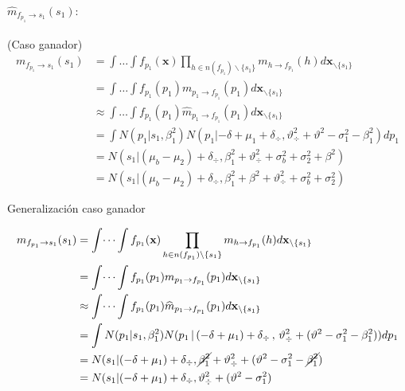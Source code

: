 \documentclass[11pt,twoside,spanish]{report} %
\begin{document}


\paragraph{$\widehat{m}_{f_{p_1} \rightarrow s_1}(s_1):$} (Caso ganador)
\begin{equation}
	\begin{split}
		m_{f_{p_1} \rightarrow s_1}(s_1) & = \int \dots \int f_{p_1}(\textbf{x}) \prod_{h \in n(f_{p_1}) \backslash \{s_1\} } m_{h \rightarrow f_{p_1}}(h)  d\textbf{x}_{\backslash \{s_1\} }  \\
		&= \int \dots \int f_{p_1}(p_1)m_{p_1 \rightarrow f_{p_1}}(p_1) d\textbf{x}_{\backslash \{s_1\} }  \\
		&\approx \int \dots \int f_{p_1}(p_1)\widehat{m}_{p_1 \rightarrow f_{p_1}}(p_1) d\textbf{x}_{\backslash \{s_1\} }  \\
		&= \int  N(p_1| s_1, \beta_1^2)  N( p_1 |  -\delta + \mu_1 + \delta_{\div} ,\vartheta_{\div}^2 + \vartheta^2 -\sigma_1^2 - \beta_1^2)   dp_1 \\
		&=  N( s_1|(\mu_b - \mu_2) + \delta_{\div} , \beta_1^2+\vartheta_{\div}^2 + \sigma_b^2 + \sigma_2^2 + \beta^2) \\
		&=  N( s_1|(\mu_b - \mu_2) + \delta_{\div} ,\beta_1^2+ \beta^2+\vartheta_{\div}^2 + \sigma_b^2 + \sigma_2^2)
	\end{split}
\end{equation}

Generalizaci\'on caso ganador

\begin{equation}
	\begin{split}
		m_{f_{p_1} \rightarrow s_1}(s_1) & = \int \dots \int f_{p_1}(\textbf{x}) \prod_{h \in n(f_{p_1}) \backslash \{s_1\} } m_{h \rightarrow f_{p_1}}(h)  d\textbf{x}_{\backslash \{s_1\} }  \\
		&= \int \dots \int f_{p_1}(p_1)m_{p_1 \rightarrow f_{p_1}}(p_1) d\textbf{x}_{\backslash \{s_1\} }  \\
		&\approx \int \dots \int f_{p_1}(p_1)\widehat{m}_{p_1 \rightarrow f_{p_1}}(p_1)d\textbf{x}_{\backslash \{s_1\} }  \\
		&=\int  N(p_1| s_1, \beta_1^2) N( p_1 \,|\, (-\delta + \mu_1) + \delta_{\div}  \,,\,\vartheta_{\div}^2 + (\vartheta^2 - \sigma_1^2 - \beta_1^2))dp_1\\
		&=  N( s_1| (-\delta + \mu_1) + \delta_{\div} , \cancel{\beta_1^2}+\vartheta_{\div}^2 + (\vartheta^2 - \sigma_1^2 - \cancel{\beta_1^2}) \\
		&=  N( s_1| (-\delta + \mu_1) + \delta_{\div} ,\vartheta_{\div}^2 + (\vartheta^2 - \sigma_1^2 )
	\end{split}
\end{equation}
\end{document}
